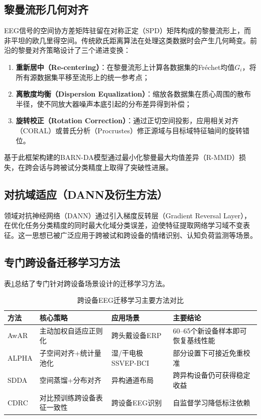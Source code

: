 \documentclass[12pt, a4paper]{article}
\begin{document}
\subsection{黎曼流形几何对齐}

EEG信号的空间协方差矩阵驻留在对称正定（SPD）矩阵构成的黎曼流形上，而非平坦的欧几里得空间\citep{Barachant2013Riemannian}。传统欧氏距离算法在处理这类数据时会产生几何畸变。前沿的黎曼对齐策略\citep{RiemannianReview2024}设计了三个递进变换：

\begin{enumerate}[leftmargin=2em]
  \item \textbf{重新居中（Re-centering）}：在黎曼流形上计算各数据集的Fréchet均值$G_i$，将所有源数据集平移至流形上的统一参考点；
  \item \textbf{离散度均衡（Dispersion Equalization）}：缩放各数据集在质心周围的散布半径，使不同放大器噪声本底引起的分布差异得到补偿；
  \item \textbf{旋转校正（Rotation Correction）}：通过正切空间投影，应用相关对齐（CORAL）或普氏分析（Procrustes）修正源域与目标域特征轴间的旋转错位。
\end{enumerate}

基于此框架构建的BARN-DA模型通过最小化黎曼最大均值差异（R-MMD）损失，在跨会话与跨被试分类精度上取得了突破性进展\citep{BARNDA2025}。

\subsection{对抗域适应（DANN及衍生方法）}

领域对抗神经网络（DANN）\citep{Ganin2016DANN}通过引入梯度反转层（Gradient Reversal Layer），在优化任务分类精度的同时最大化域分类误差，迫使特征提取网络学习域不变表征。这一思想已被广泛应用于跨被试和跨设备的情绪识别、认知负荷监测等场景\citep{crossSubjectMI2025}。

\subsection{专门跨设备迁移学习方法}

表\ref{tab:transfer}总结了专门针对跨设备场景设计的迁移学习方法。

\begin{table}[H]
\centering
\caption{跨设备EEG迁移学习主要方法对比}
\label{tab:transfer}
\small
\begin{tabularx}{\textwidth}{lXXX}
\toprule
\textbf{方法} & \textbf{核心策略} & \textbf{应用场景} & \textbf{主要结论} \\
\midrule
AwAR \citep{Wu2017AwAR} & 主动加权自适应正则化 & 跨头戴设备ERP & 60--65个新设备样本即可恢复基线性能 \\
\addlinespace
ALPHA \citep{Liu2022ALPHA} & 子空间对齐+统计量池化 & 湿/干电极SSVEP-BCI & 部分设置下可接近免重校准 \\
\addlinespace
SDDA \citep{Liu2025SDDA} & 空间蒸馏+分布对齐 & 异构通道布局 & 跨异构设备仍可获得稳定收益 \\
\addlinespace
CDRC \citep{Zhang2025CDRC} & 对比预训练跨设备表征一致性 & 跨设备EEG识别 & 自监督学习降低标注依赖 \\
\bottomrule
\end{tabularx}
\end{table}
\end{document}
